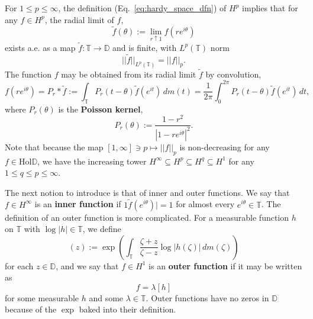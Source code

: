 \begin{appendices}
For $1\leq p\leq \infty$, the definition (Eq.~\ref{eq:hardy_space_dfn}) of $H^p$ implies that for any $f\in H^p$, the radial limit of $f$,
\begin{equation}
    \tilde{f}(\theta) := \lim_{r\uparrow 1} f(re^{i\theta})
\end{equation}
exists a.e. as a map $\tilde{f} : \mathbb T\rightarrow \mathbb D$ and is finite, with $L^p(\mathbb T)$ norm
\begin{equation}
    ||\tilde{f}||_{L^p(\mathbb T)} = ||f||_p. 
\end{equation}
The function $f$ may be obtained from its radial limit $\tilde{f}$ by convolution,
\begin{equation}
    f(re^{i\theta}) = P_r * \tilde f := \int_{\mathbb T} P_r(t - \theta) \tilde f(e^{it})\, dm(t) = \frac{1}{2\pi} \int_{0}^{2\pi} P_{r}(t - \theta) \tilde f(e^{it})\, dt,
\end{equation}
where $P_r(\theta)$ is the \textbf{Poisson kernel},
\begin{equation}
    P_r(\theta) := \frac{1 - r^2}{|1 - re^{i\theta}|^2}. 
\end{equation}
Note that because the map $[1, \infty]\ni p \mapsto ||f||_p$ is non-decreasing for any $f\in\mathrm{Hol}{\mathbb D}$, we have the increasing tower $H^\infty \subseteq H^p \subseteq H^q \subseteq H^1$ for any $1\leq q\leq p\leq \infty$. 

The next notion to introduce is that of inner and outer functions. We say that $f\in H^\infty$ is an \textbf{inner function} if $1\tilde{f}(e^{i\theta})| = 1$ for almost every $e^{i\theta}\in\mathbb T$. The definition of an outer function is more complicated. For a measurable function $h$ on $\mathbb T$ with $\log |h|\in\mathbb T$, we define
\begin{equation}
    [h](z) := \exp \left( \int_{\mathbb T} \frac{\zeta + z}{\zeta - z} \log |h(\zeta)|\, dm(\zeta) \right)
\end{equation}
for each $z\in\mathbb D$, and we say that $f\in H^1$ is an \textbf{outer function} if it may be written as
\begin{equation}
    f = \lambda [h]
\end{equation}
for some measurable $h$ and some $\lambda\in\mathbb T$. Outer functions have no zeros in $\mathbb D$ because of the $\exp$ baked into their definition. 


\end{appendices}
